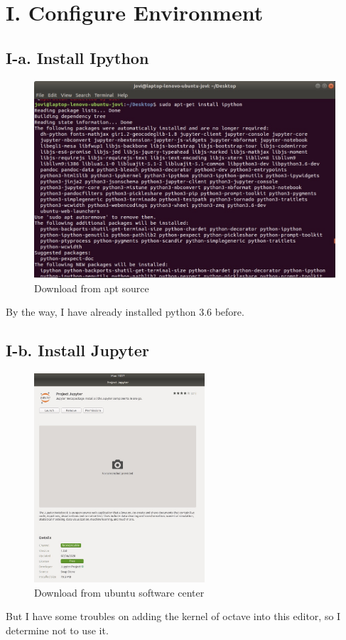 \documentclass[twoside,a4paper]{article}
\begin{document}
\pagestyle{fancy}
\fancyhead{}


\section*{I. Configure Environment}

\subsection*{I-a. Install Ipython} 

\begin{figure}[htp]
\centering
\includegraphics[width=4.5in]{ipython.jpeg}
\caption{Download from apt source}
\end{figure}
By the way, I have already installed python 3.6 before.
\vbox{}\vbox{}\vbox{}\vbox{}\vbox{}

\subsection*{I-b. Install Jupyter}
\begin{figure}[hbp]
\centering
\includegraphics[width=2.5in]{jupyter.jpeg}
\caption{Download from ubuntu software center}
\end{figure}
But I have some troubles on adding the kernel of octave into this editor, so I determine not to use it.
\vbox{}\vbox{}\vbox{}\vbox{}\vbox{}\vbox{}\vbox{}\vbox{}\vbox{}\vbox{}
\end{document}
